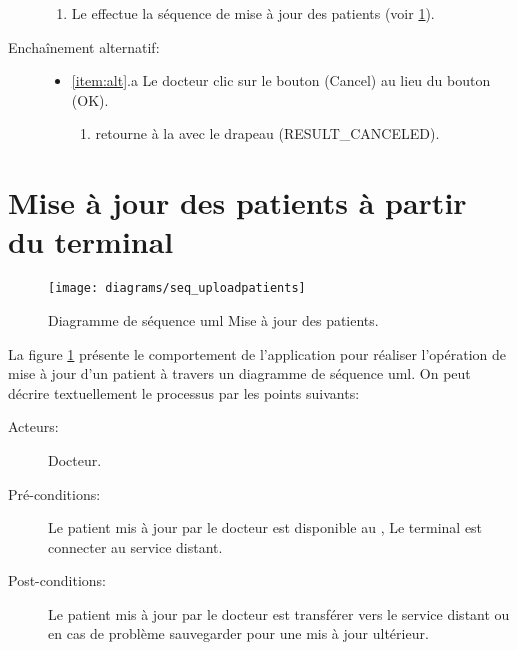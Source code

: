 \begin{description}
\begin{enumerate}
\item Le  effectue la séquence de mise à jour des patients (voir \ref{s:patientUpdate}).

\end{enumerate}

\item [Enchaînement alternatif:]

\begin{itemize}

\item \ref{item:alt}.a Le docteur clic sur le bouton (Cancel) au lieu du bouton (OK).
\begin{enumerate}

\item {} retourne à la  avec le drapeau (RESULT\_CANCELED).

\end{enumerate}

\end{itemize}


\end{description}

\section{Mise à jour des patients à partir du terminal}
\label{s:patientUpdate}

\begin{figure}
\center
\texttt{[image: diagrams/seq\_uploadpatients]}
\caption{Diagramme de séquence \gls{uml} Mise à jour des patients.}
\label{fig:seq_uploadpatients}
\end{figure}

La figure \ref{fig:seq_uploadpatients} présente le comportement de l'application pour réaliser l'opération de mise à jour d'un patient à travers un diagramme de séquence \gls{uml}. On peut décrire textuellement le processus par les points suivants:


\begin{description}

\item[Acteurs:] Docteur.

\item[Pré-conditions:] Le patient mis à jour par le docteur est disponible au , Le terminal est connecter au service distant.

\item[Post-conditions:] Le patient mis à jour par le docteur est transférer vers le service distant ou en cas de problème sauvegarder pour une mis à jour ultérieur.

\end{description}

